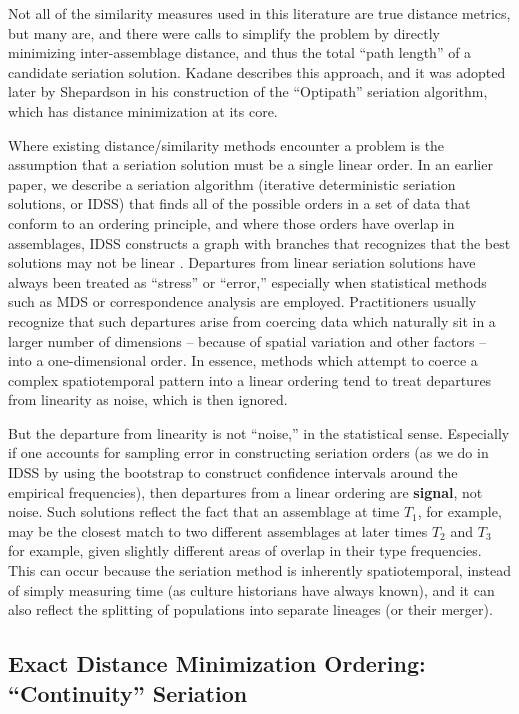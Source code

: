 \documentclass[graybox,natbib]{svmult}
\begin{document}
Not all of the similarity measures used in this literature are true
distance metrics, but many are, and there were calls to simplify the
problem by directly minimizing inter-assemblage distance, and thus the
total ``path length'' of a candidate seriation solution. Kadane
\citeyearpar{Kadane1971} describes this approach, and it was adopted
later by Shepardson \citeyearpar{shepardson2006} in his construction of
the ``Optipath'' seriation algorithm, which has distance minimization at
its core.

Where existing distance/similarity methods encounter a problem is the
assumption that a seriation solution must be a single linear order. In
an earlier paper, we describe a seriation algorithm (iterative
deterministic seriation solutions, or IDSS) that finds all of the
possible orders in a set of data that conform to an ordering principle,
and where those orders have overlap in assemblages, IDSS constructs a
graph with branches that recognizes that the best solutions may not be
linear \citep{lipomadsendunnell2015}. Departures from linear seriation
solutions have always been treated as ``stress'' or ``error,''
especially when statistical methods such as MDS or correspondence
analysis are employed. Practitioners usually recognize that such
departures arise from coercing data which naturally sit in a larger
number of dimensions -- because of spatial variation and other factors
-- into a one-dimensional order. In essence, methods which attempt to
coerce a complex spatiotemporal pattern into a linear ordering tend to
treat departures from linearity as noise, which is then ignored.

But the departure from linearity is not ``noise,'' in the statistical
sense. Especially if one accounts for sampling error in constructing
seriation orders (as we do in IDSS by using the bootstrap to construct
confidence intervals around the empirical frequencies), then departures
from a linear ordering are \textbf{signal}, not noise. Such solutions
reflect the fact that an assemblage at time \(T_1\), for example, may be
the closest match to two different assemblages at later times \(T_2\)
and \(T_3\) for example, given slightly different areas of overlap in
their type frequencies. This can occur because the seriation method is
inherently spatiotemporal, instead of simply measuring time (as culture
historians have always known), and it can also reflect the splitting of
populations into separate lineages (or their merger).

\subsection{\texorpdfstring{Exact Distance Minimization Ordering:
``Continuity''
Seriation}{Exact Distance Minimization Ordering: Continuity Seriation}}\label{exact-distance-minimization-ordering-continuity-seriation}
\end{document}
